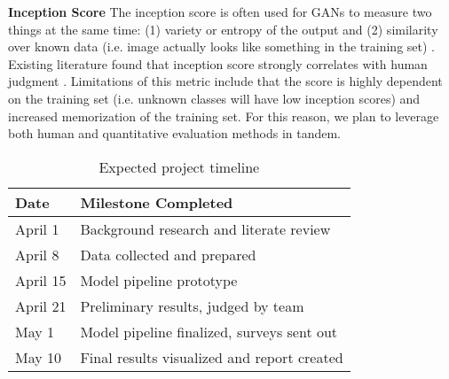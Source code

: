 \documentclass{article}
\begin{document}
\textbf{Inception Score} The inception score is often used for GANs to measure two things at the same time: (1) variety or entropy of the output and (2) similarity over known data (i.e. image actually looks like something in the training set) \cite{salimans2016eval}. Existing literature found that inception score strongly correlates with human judgment \cite{szegedy2015is}. Limitations of this metric include that the score is highly dependent on the training set (i.e. unknown classes will have low inception scores) and increased memorization of the training set. For this reason, we plan to leverage both human and quantitative evaluation methods in tandem.

\begin{table}[h]
\centering
\begin{tabular}{|l|l|}
\hline
\textbf{Date} & \textbf{Milestone Completed}                \\ \hline
April 1       & Background research and literate review     \\ \hline
April 8       & Data collected and prepared                 \\ \hline
April 15      & Model pipeline prototype                    \\ \hline
April 21      & Preliminary results, judged by team         \\ \hline
May 1         & Model pipeline finalized, surveys sent out  \\ \hline
May 10        & Final results visualized and report created \\ \hline
\end{tabular}
\caption{Expected project timeline}
\end{table}






\newpage





\end{document}
